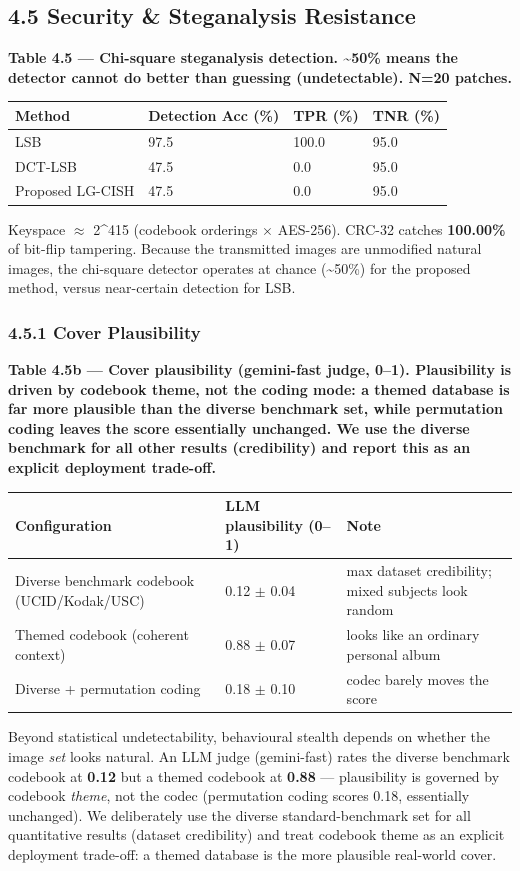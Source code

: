 \documentclass[11pt]{article}
\begin{document}
\subsection*{4.5 Security \& Steganalysis Resistance}
\textbf{Table 4.5 --- Chi-square steganalysis detection. \textasciitilde{}50\% means the detector cannot do better than guessing (undetectable). N=20 patches.}
\begin{table}[H]\centering\small
\begin{tabularx}{\textwidth}{lXXX}
\toprule
Method & Detection Acc (\%) & TPR (\%) & TNR (\%) \\
\midrule
LSB & 97.5 & 100.0 & 95.0 \\
DCT-LSB & 47.5 & 0.0 & 95.0 \\
Proposed LG-CISH & 47.5 & 0.0 & 95.0 \\
\bottomrule
\end{tabularx}
\end{table}
Keyspace $\approx$ 2\textasciicircum{}415 (codebook orderings $\times$ AES-256). CRC-32 catches \textbf{100.00\%} of bit-flip tampering. Because the transmitted images are unmodified natural images, the chi-square detector operates at chance (\textasciitilde{}50\%) for the proposed method, versus near-certain detection for LSB.
\subsubsection*{4.5.1 Cover Plausibility}
\textbf{Table 4.5b --- Cover plausibility (gemini-fast judge, 0--1). Plausibility is driven by codebook theme, not the coding mode: a themed database is far more plausible than the diverse benchmark set, while permutation coding leaves the score essentially unchanged. We use the diverse benchmark for all other results (credibility) and report this as an explicit deployment trade-off.}
\begin{table}[H]\centering\small
\begin{tabularx}{\textwidth}{lXX}
\toprule
Configuration & LLM plausibility (0--1) & Note \\
\midrule
Diverse benchmark codebook (UCID/Kodak/USC) & 0.12 $\pm$ 0.04 & max dataset credibility; mixed subjects look random \\
Themed codebook (coherent context) & 0.88 $\pm$ 0.07 & looks like an ordinary personal album \\
Diverse + permutation coding & 0.18 $\pm$ 0.10 & codec barely moves the score \\
\bottomrule
\end{tabularx}
\end{table}
Beyond statistical undetectability, behavioural stealth depends on whether the image \emph{set} looks natural. An LLM judge (gemini-fast) rates the diverse benchmark codebook at \textbf{0.12} but a themed codebook at \textbf{0.88} --- plausibility is governed by codebook \emph{theme}, not the codec (permutation coding scores 0.18, essentially unchanged). We deliberately use the diverse standard-benchmark set for all quantitative results (dataset credibility) and treat codebook theme as an explicit deployment trade-off: a themed database is the more plausible real-world cover.
\end{document}
